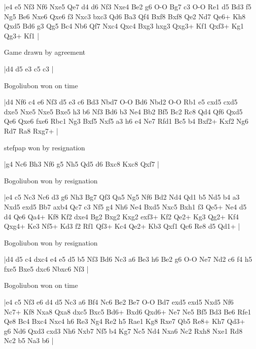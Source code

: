 \makegametitle
|e4 e5 Nf3 Nf6 Nxe5 Qe7 d4 d6 Nf3 Nxe4 Be2 g6 O-O Bg7 c3 O-O Re1 d5 Bd3 f5 Ng5 Be6 Nxe6 Qxe6 f3 Nxc3 bxc3 Qd6 Ba3 Qf4 Bxf8 Bxf8 Qe2 Nd7 Qe6+ Kh8 Qxd5 Bd6 g3 Qg5 Bc4 Nb6 Qf7 Nxc4 Qxc4 Bxg3 hxg3 Qxg3+ Kf1 Qxf3+ Kg1 Qg3+ Kf1  |

\showboard

Game drawn by agreement

\makegametitle
|d4 d5 e3 c5 c3  |

\showboard

Bogoliubon won on time

\makegametitle
|d4 Nf6 c4 e6 Nf3 d5 e3 c6 Bd3 Nbd7 O-O Bd6 Nbd2 O-O Rb1 e5 cxd5 cxd5 dxe5 Nxe5 Nxe5 Bxe5 h3 b6 Nf3 Bd6 b3 Ne4 Bb2 Bf5 Bc2 Rc8 Qd4 Qf6 Qxd5 Qe6 Qxe6 fxe6 Rbc1 Ng3 Bxf5 Nxf5 a3 h6 e4 Ne7 Rfd1 Bc5 b4 Bxf2+ Kxf2 Ng6 Rd7 Ra8 Rxg7+  |

\showboard

stefpap won by resignation

\makegametitle
|g4 Nc6 Bh3 Nf6 g5 Nh5 Qd5 d6 Bxc8 Kxc8 Qxf7  |

\showboard

Bogoliubon won by resignation

\makegametitle
|e4 c5 Nc3 Nc6 d3 g6 Nh3 Bg7 Qf3 Qa5 Ng5 Nf6 Bd2 Nd4 Qd1 b5 Nd5 b4 a3 Nxd5 exd5 Bb7 axb4 Qc7 c3 Nf5 g4 Nh6 Ne4 Bxd5 Nxc5 Bxh1 f3 Qe5+ Ne4 d5 d4 Qe6 Qa4+ Kf8 Kf2 dxe4 Bg2 Bxg2 Kxg2 exf3+ Kf2 Qe2+ Kg3 Qg2+ Kf4 Qxg4+ Ke3 Nf5+ Kd3 f2 Rf1 Qf3+ Kc4 Qe2+ Kb3 Qxf1 Qc6 Re8 d5 Qd1+  |

\showboard

Bogoliubon won by resignation

\makegametitle
|d4 d5 c4 dxc4 e4 e5 d5 b5 Nf3 Bd6 Nc3 a6 Be3 h6 Be2 g6 O-O Ne7 Nd2 c6 f4 h5 fxe5 Bxe5 dxc6 Nbxc6 Nf3  |

\showboard

Bogoliubon won on time

\makegametitle
|e4 c5 Nf3 e6 d4 d5 Nc3 a6 Bf4 Nc6 Be2 Be7 O-O Bd7 exd5 exd5 Nxd5 Nf6 Nc7+ Kf8 Nxa8 Qxa8 dxc5 Bxc5 Bd6+ Bxd6 Qxd6+ Ne7 Ne5 Bf5 Bd3 Be6 Rfe1 Qe8 Bc4 Bxc4 Nxc4 h6 Re3 Ng4 Re2 h5 Rae1 Kg8 Rxe7 Qb5 Re8+ Kh7 Qd3+ g6 Nd6 Qxd3 cxd3 Nh6 Nxb7 Nf5 b4 Kg7 Nc5 Nd4 Nxa6 Nc2 Rxh8 Nxe1 Rd8 Nc2 b5 Na3 b6  |

